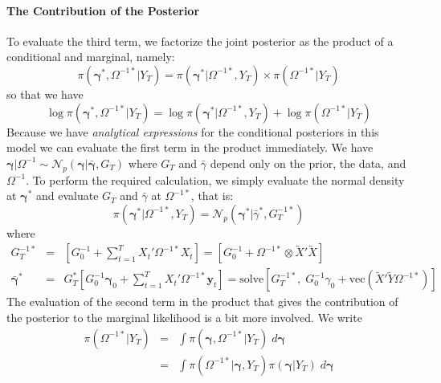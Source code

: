 \documentclass[12pt]{article}
\begin{document}
\paragraph{The Contribution of the Posterior}
To evaluate the third term, we factorize the joint posterior as the product of a conditional and marginal, namely:
\begin{equation*}
\pi\left( \boldsymbol{\gamma}^*, \Omega^{-1*}|Y_T \right) = \pi\left( \boldsymbol{\gamma}^*|\Omega^{-1*},Y_T \right) \times \pi\left( \Omega^{-1*}|Y_T \right)
\end{equation*}
so that we have
\begin{equation*}
\log \pi\left( \boldsymbol{\gamma}^*, \Omega^{-1*}|Y_T \right) = \log \pi\left( \boldsymbol{\gamma}^*|\Omega^{-1*},Y_T \right) + \log \pi\left( \Omega^{-1*}|Y_T \right)
\end{equation*}
Because we have \emph{analytical expressions} for the conditional posteriors in this model we can evaluate the first term in the product immediately.
We have $\boldsymbol{\gamma}|\Omega^{-1} \sim \mathcal{N}_p\left( \boldsymbol{\gamma}|\bar{\boldsymbol{\gamma}}, G_T \right)$ where $G_T$ and $\bar{\gamma}$ depend only on the prior, the data, and $\Omega^{-1}$.
To perform the required calculation, we simply evaluate the normal density at $\boldsymbol{\gamma}^*$ and evaluate $G_T$ and $\bar{\gamma}$ at $\Omega^{-1*}$, that is:
\begin{equation*}
\pi\left( \boldsymbol{\gamma}^*|\Omega^{-1*}, Y_T \right) = \mathcal{N}_p\left( \boldsymbol{\gamma}^*|\bar{\gamma}^*, G_T^{-1*}\right)
\end{equation*}
where
\begin{eqnarray*}
	G_T^{-1*} &=& \left[ G_0^{-1} + \sum_{t=1}^T X_t' \Omega^{-1*} X_t \right] = \left[ G_0^{-1} + \Omega^{-1*} \otimes \widetilde{X}'\widetilde{X} \right]\\
	\bar{\boldsymbol{\gamma}}^* &=& G_T^* \left[ G_0^{-1}\boldsymbol{\gamma}_0 + \sum_{t=1}^{T} X_t'\Omega^{-1*}\mathbf{y}_t \right] = \mbox{solve}\left[G_T^{-1*},\;  G_0^{-1}\gamma_0 + \mbox{vec}\left( \widetilde{X}'\widetilde{Y}\Omega^{-1*} \right) \right]
\end{eqnarray*}
The evaluation of the second term in the product that gives the contribution of the posterior to the marginal likelihood is a bit more involved.
We write
\begin{eqnarray*}
	\pi\left( \Omega^{-1*}|Y_T \right) &=&  \int \pi\left( \boldsymbol{\gamma},\Omega^{-1*}|Y_T \right) \; d\boldsymbol{\gamma}\\
	&=& \int \pi\left( \Omega^{-1*}|\boldsymbol{\gamma}, Y_T \right)\pi\left( \boldsymbol{\gamma}|Y_T \right)\; d\boldsymbol{\gamma}
\end{eqnarray*}
\end{document}
